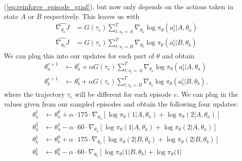 \documentclass{article}
\begin{document}
\begin{enumerate}
\begin{enumerate}
		            (\ref{eq:reinforce_episode_grad}), but now only depends on the actions taken in
		            state $A$ or $B$ respectively. This leaves us with
		            \begin{align}
			            \widehat{\nabla_{\theta_a} J} & = G(\tau_e) \sum_{t : s_t = A}^T\nabla_{\theta_a}
			            \log \pi_\theta(a_t^i| A, \theta_a)                                               \\
			            \widehat{\nabla_{\theta_b} J} & = G(\tau_e) \sum_{t : s_t = B}^T\nabla_{\theta_b}
			            \log \pi_\theta(a_t^i| B, \theta_b)
		            \end{align}
		            We can plug this into our updates for each part of $\theta$ and obtain
		            \begin{align}
			            \theta^{e+1}_a & \leftarrow \theta^e_a + \alpha G(\tau_e) \sum_{t : s_t
				            = A}^T\nabla_{\theta_a} \log \pi_\theta(a_t^i| A, \theta_a)
			            \label{eq:reinforce_a_update}                                           \\
			            \theta^{e+1}_b & \leftarrow \theta^e_b + \alpha G(\tau_e) \sum_{t : s_t
				            = B}^T\nabla_{\theta_b} \log \pi_\theta(a_t^i| B,
			            \theta_b),\label{eq:reinforce_b_update}
		            \end{align}
		            where the trajectory $\tau_e$ will be different for each episode $e$. We can plug in the
		            values given from our sampled episodes and obtain the following four updates:
		            \begin{align}
			            \theta^1_a & \leftarrow \theta^0_a + \alpha \cdot 175 \cdot
			            \nabla_{\theta_a}\left[ \log \pi_\theta(1| A, \theta_a) + \log \pi_\theta(2|
			            A, \theta_a)\right]                                         \\
			            \theta^2_a & \leftarrow \theta^1_a - \alpha \cdot 60 \cdot
			            \nabla_{\theta_a}\left[ \log \pi_\theta(1| A, \theta_a) + \log \pi_\theta(2|
			            A, \theta_a)\right]                                         \\
			            \theta^1_b & \leftarrow \theta^0_b + \alpha \cdot 175 \cdot
			            \nabla_{\theta_b}\left[ \log \pi_\theta(2| B, \theta_b) + \log \pi_\theta(2|
			            B, \theta_b)\right]                                         \\
			            \theta^1_b & \leftarrow \theta^0_b - \alpha \cdot 60 \cdot
			            \nabla_{\theta_b}\left[ \log \pi_\theta(1| B, \theta_b) + \log \pi_\theta(1|

\end{align}
\end{enumerate}
\end{enumerate}
\end{document}
